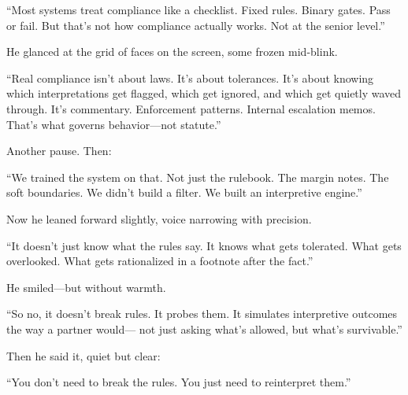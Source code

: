   ``Most systems treat compliance like a checklist.  
  Fixed rules. Binary gates. Pass or fail.  
  But that’s not how compliance actually works.  
  Not at the senior level.''  

He glanced at the grid of faces on the screen, some frozen mid-blink.

  ``Real compliance isn’t about laws. It’s about tolerances.  
  It’s about knowing which interpretations get flagged,  
  which get ignored, and which get quietly waved through.  
  It's commentary. Enforcement patterns. Internal escalation memos.  
  That’s what governs behavior—not statute.''

Another pause. Then:

  ``We trained the system on that.  
  Not just the rulebook. The margin notes.  
  The soft boundaries.  
  We didn’t build a filter.  
  We built an interpretive engine.''

Now he leaned forward slightly, voice narrowing with precision.

  ``It doesn’t just know what the rules say.  
  It knows what gets tolerated.  
  What gets overlooked.  
  What gets rationalized in a footnote after the fact.''

He smiled—but without warmth.

  ``So no, it doesn’t break rules.  
  It probes them.  
  It simulates interpretive outcomes the way a partner would—  
  not just asking what’s allowed,  
  but what’s survivable.''

Then he said it, quiet but clear:

  ``You don’t need to break the rules.  
  You just need to reinterpret them.''

\medskip

